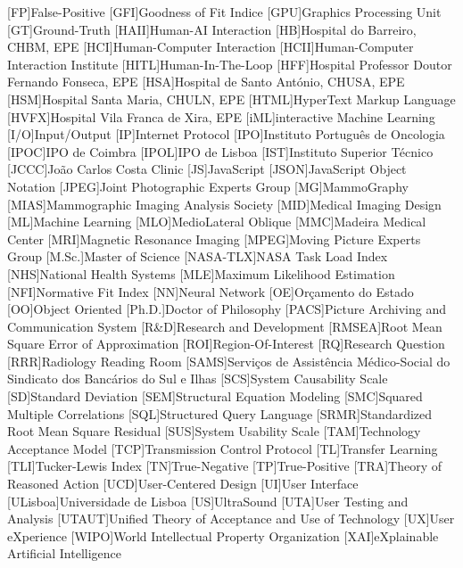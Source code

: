 \begin{acronym}[H.264/SVC]
[FP]{False-Positive}
[GFI]{Goodness of Fit Indice}
[GPU]{Graphics Processing Unit}
[GT]{Ground-Truth}
[HAII]{Human-AI Interaction}
[HB]{Hospital do Barreiro, \acs{CHBM}, \acs{EPE}}
[HCI]{Human-Computer Interaction}
[HCII]{Human-Computer Interaction Institute}
[HITL]{Human-In-The-Loop}
[HFF]{Hospital Professor Doutor Fernando Fonseca, \acs{EPE}}
[HSA]{Hospital de Santo Ant\'{o}nio, \acs{CHUSA}, \acs{EPE}}
[HSM]{Hospital Santa Maria, \acs{CHULN}, \acs{EPE}}
[HTML]{HyperText Markup Language}
[HVFX]{Hospital Vila Franca de Xira, \acs{EPE}}
[iML]{interactive Machine Learning}
[I/O]{Input/Output}
[IP]{Internet Protocol}
[IPO]{Instituto Portugu\^{e}s de Oncologia}
[IPOC]{\acl{IPO} de Coimbra}
[IPOL]{\acl{IPO} de Lisboa}
[IST]{Instituto Superior T\'{e}cnico}
[JCCC]{Jo\~{a}o Carlos Costa Clinic}
[JS]{JavaScript}
[JSON]{JavaScript Object Notation}
[JPEG]{Joint Photographic Experts Group}
[MG]{MammoGraphy}
[MIAS]{Mammographic Imaging Analysis Society}
[MID]{Medical Imaging Design}
[ML]{Machine Learning}
[MLO]{MedioLateral Oblique}
[MMC]{Madeira Medical Center}
[MRI]{Magnetic Resonance Imaging}
[MPEG]{Moving Picture Experts Group}
[M.Sc.]{Master of Science}
[NASA-TLX]{NASA Task Load Index}
[NHS]{National Health Systems}
[MLE]{Maximum Likelihood Estimation}
[NFI]{Normative Fit Index}
[NN]{Neural Network}
[OE]{Or\c{c}amento do Estado}
[OO]{Object Oriented}
[Ph.D.]{Doctor of Philosophy}
[PACS]{Picture Archiving and Communication System}
[R\&D]{Research and Development}
[RMSEA]{Root Mean Square Error of Approximation}
[ROI]{Region-Of-Interest}
[RQ]{Research Question}
[RRR]{Radiology Reading Room}
[SAMS]{Serviços de Assist\^{e}ncia M\'{e}dico-Social do Sindicato dos Banc\'{a}rios do Sul e Ilhas}
[SCS]{System Causability Scale}
[SD]{Standard Deviation}
[SEM]{Structural Equation Modeling}
[SMC]{Squared Multiple Correlations}
[SQL]{Structured Query Language}
[SRMR]{Standardized Root Mean Square Residual}
[SUS]{System Usability Scale}
[TAM]{Technology Acceptance Model}
[TCP]{Transmission Control Protocol}
[TL]{Transfer Learning}
[TLI]{Tucker-Lewis Index}
[TN]{True-Negative}
[TP]{True-Positive}
[TRA]{Theory of Reasoned Action}
[UCD]{User-Centered Design}
[UI]{User Interface}
[ULisboa]{Universidade de Lisboa}
[US]{UltraSound}
[UTA]{User Testing and Analysis}
[UTAUT]{Unified Theory of Acceptance and Use of Technology}
[UX]{User eXperience}
[WIPO]{World Intellectual Property Organization}
[XAI]{eXplainable Artificial Intelligence}
\end{acronym}